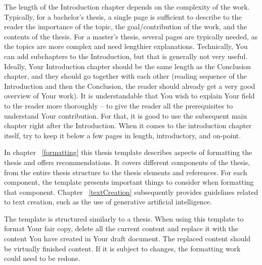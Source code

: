 The length of the Introduction chapter depends on the complexity of the work. Typically, for a bachelor’s thesis, a single page is sufficient to describe to the reader the importance of the topic, the goal/contribution of the work, and the contents of the thesis. For a master’s thesis, several pages are typically needed, as the topics are more complex and need lengthier explanations. Technically, You can add subchapters to the Introduction, but that is generally not very useful. Ideally, Your Introduction chapter should be the same length as the Conclusion chapter, and they should go together with each other (reading sequence of the Introduction and then the Conclusion, the reader should already get a very good overview of Your work). It is understandable that You wish to explain Your field to the reader more thoroughly – to give the reader all the prerequisites to understand Your contribution. For that, it is good to use the subsequent main chapter right after the Introduction. When it comes to the introduction chapter itself, try to keep it below a few pages in length, introductory, and on-point.

In chapter ~\ref{formatting} this thesis template describes aspects of formatting the thesis and offers recommendations. It covers different components of the thesis, from the entire thesis structure to the thesis elements and references. For each component, the template presents important things to consider when formatting that component. Chapter ~\ref{textCreation} subsequently provides guidelines related to text creation, such as the use of generative artificial intelligence.

The template is structured similarly to a thesis. When using this template to format Your fair copy, delete all the current content and replace it with the content You have created in Your draft document. The replaced content should be virtually finished content. If it is subject to changes, the formatting work could need to be redone.